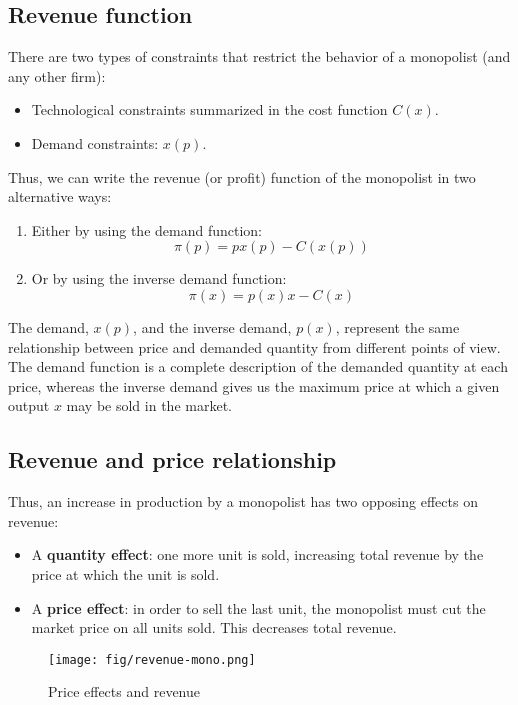 \subsection{Revenue function}\label{revenue-function}

There are two types of constraints that restrict the behavior of a monopolist (and any other firm):

\begin{itemize}
	\item
	Technological constraints summarized in the cost function \(C(x)\).
	\item
	Demand constraints: \(x(p)\).
\end{itemize}

Thus, we can write the revenue (or profit) function of the monopolist in two alternative ways:

\begin{enumerate}
	\item
	Either by using the demand function:
	\[
	\pi(p) = px(p) - C(x(p))
	\]
	\item
	Or by using the inverse demand function:
	\[
	\pi(x) = p(x)x - C(x)
	\]
\end{enumerate}

The demand, \(x(p)\), and the inverse demand, \(p(x)\), represent the same relationship between price and demanded quantity from different points of view. The demand function is a complete description of the demanded quantity at each price, whereas the inverse demand gives us the maximum price at which a given output \(x\) may be sold in the market.

\subsection{Revenue and price relationship}\label{revenue-and-price-relationship}

Thus, an increase in production by a monopolist has two opposing effects on revenue:

\begin{itemize}
	\item
	A \textbf{quantity effect}: one more unit is sold, increasing total revenue by the price at which the unit is sold.
	\item
	A \textbf{price effect}: in order to sell the last unit, the monopolist must cut the market price on all units sold. This decreases total revenue.
\end{itemize}

\begin{figure}
	\centering
	\texttt{[image: fig/revenue-mono.png]}
	\caption{Price effects and revenue}\label{fig:revenue-mono}
\end{figure}

